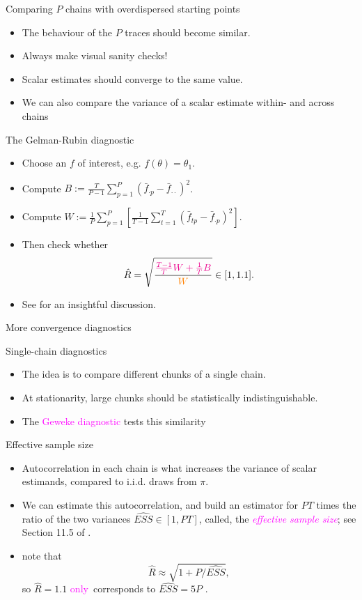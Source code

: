 \documentclass[10pt]{beamer}
\let\oldcite=\cite
\renewcommand\cite[1]{\hyperlink{#1}{\textcolor{vert}{\oldcite{#1}}}}
\let\oldcitep=\citep
\renewcommand\citep[1]{\hyperlink{#1}{\textcolor{vert}{\oldcitep{#1}}}}
\renewcommand\un[1]{\textcolor{magenta}{#1}}
\newcommand\unnnn[1]{\textcolor{orange}{#1}}
\begin{document}
\begin{frame}{Comparing $P$ chains with overdispersed starting points}
\begin{itemize}
  \item The behaviour of the $P$ traces should become similar.
  \item Always make visual sanity checks!
  \item Scalar estimates should converge to the same value.
  \item We can also compare the variance of a scalar estimate within- and across chains
\end{itemize}

  \begin{block}{The Gelman-Rubin diagnostic}
  \begin{itemize}
    \item Choose an $f$ of interest, e.g. $f(\theta) = \theta_1$.
    \item Compute $B:=\frac{T}{P-1}\sum_{p=1}^P (\bar f_{\cdot p} - \bar f_{\cdot\cdot})^2$.
    \item Compute $W:=\frac1P \sum_{p=1}^P\left[ \frac{1}{T-1} \sum_{t=1}^T (\bar f_{tp}-\bar f_{\cdot p})^2\right].$
    \item Then check whether
    $$\hat R = \sqrt{\frac{\un{\frac{T-1}{T}W + \frac1T B}}{\unnnn{W}}}\in[1,1.1].$$
    \item See \citep{VaKn21} for an insightful discussion.
  \end{itemize}
\end{block}
\end{frame}

\begin{frame}{More convergence diagnostics}
\begin{block}{Single-chain diagnostics}
  \begin{itemize}
  \item The idea is to compare different chunks of a single chain.
  \item At stationarity, large chunks should be statistically indistinguishable.
  \item The \un{Geweke diagnostic} tests this similarity \citep{Gew92}
  \end{itemize}
\end{block}

\begin{block}{Effective sample size}
  \begin{itemize}
  \item Autocorrelation in each chain is what increases the variance of scalar estimands, compared to i.i.d. draws from $\pi$.
  \item We can estimate this autocorrelation, and build an estimator for $PT$ times the ratio of the two variances $\widehat{ESS}\in [1,PT]$, called, the \un{\emph{effective sample size}}; see Section 11.5 of \citep{GCSDVR13}.
  \item \cite{VaKn21} note that
  $$\hat R \approx \sqrt{1+P/\widehat{ESS}},$$ so $\hat R=1.1$ \un{only} corresponds to $\widehat{ESS}=5P$ .
  \end{itemize}
\end{block}
\end{frame}
\end{document}
